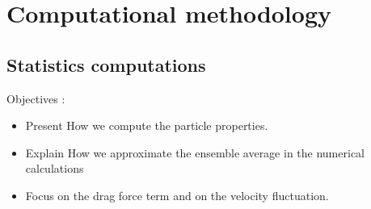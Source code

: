 \documentclass[12pt]{My_preprint}
\begin{document}
% 

% 
% 

\section{Computational methodology}






\subsection{Statistics computations}

Objectives : 
\begin{itemize}
    \item Present How we compute the particle properties. 
    \item Explain How we approximate the ensemble average in the numerical calculations
    \item Focus on the drag force term and on the velocity fluctuation. 
\end{itemize}
\end{document}
